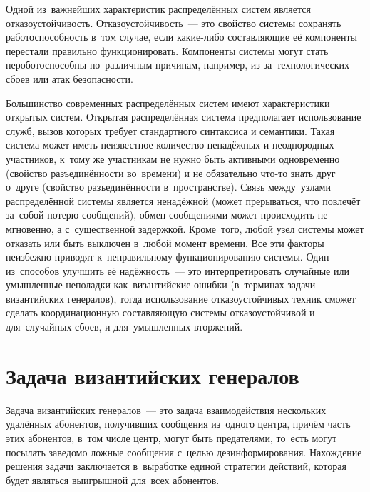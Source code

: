 Одной из~важнейших характеристик распределённых систем является отказоустойчивость. Отказоустойчивость~--- это свойство системы сохранять работоспособность в~том случае, если какие-либо составляющие её компоненты перестали правильно функционировать. Компоненты системы могут стать нероботоспособны по~различным причинам, например, из-за~технологических сбоев или атак безопасности.

Большинство современных распределённых систем имеют характеристики открытых систем. Открытая распределённая система предполагает использование служб, вызов которых требует стандартного синтаксиса и семантики. Такая система может иметь неизвестное количество ненадёжных и неоднородных участников, к~тому же участникам не нужно быть активными одновременно (свойство разъединённости во~времени) и не обязательно что-то знать друг о~друге (свойство разъединённости в~пространстве). Связь между~узлами распределённой системы является ненадёжной (может прерываться, что повлечёт за~собой потерю сообщений), обмен сообщениями может происходить не мгновенно, а с~существенной задержкой. Кроме~того, любой узел системы может отказать или быть выключен в~любой момент времени. Все эти факторы неизбежно приводят к~неправильному функционированию системы. Один из~способов улучшить её надёжность~--- это интерпретировать случайные или умышленные неполадки как~византийские ошибки (в~терминах задачи византийских генералов), тогда использование отказоустойчивых техник сможет сделать координационную составляющую системы отказоустойчивой и для~случайных сбоев, и для~умышленных вторжений.

\section{Задача византийских генералов}\label{sec:2}
Задача византийских генералов~--- это задача взаимодействия нескольких удалённых абонентов, получивших сообщения из~одного центра, причём часть этих абонентов, в~том числе центр, могут быть предателями, то~есть могут посылать заведомо ложные сообщения с~целью дезинформирования. Нахождение решения задачи заключается в~выработке единой стратегии действий, которая будет являться выигрышной для~всех абонентов.

